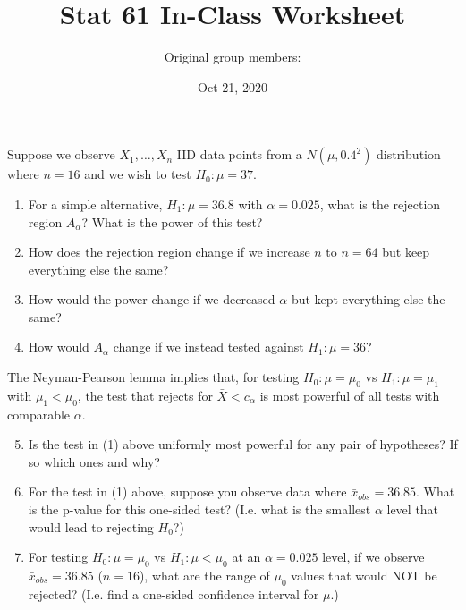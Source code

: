 \documentclass[12pt]{article}
\title{Stat 61 In-Class Worksheet}
\date{Oct 21, 2020}
\author{Original group members: }
\begin{document}
\maketitle



\noindent Suppose we observe $X_1, \dots, X_n$ IID data points from a $N(\mu, 0.4^2)$ distribution where $n=16$ and we wish to test $H_0: \mu = 37$. 


\begin{enumerate}[leftmargin=\labelsep]
\item For a simple alternative, $H_1: \mu = 36.8$ with $\alpha = 0.025$, what is the rejection region $A_{\alpha}$? What is the power of this test?

\vspace{6cm}

\item How does the rejection region change if we increase $n$ to $n=64$ but keep everything else the same? 
\vspace{2cm}

\item How would the power change if we decreased $\alpha$ but kept everything else the same? 
\vspace{2cm}

\item How would $A_{\alpha}$ change if we instead tested against $H_1: \mu = 36$?

\vspace{2cm}
\end{enumerate}

\pagebreak 

\noindent The Neyman-Pearson lemma implies that, for testing $H_0: \mu = \mu_0$ vs $H_1: \mu = \mu_1$ with $\mu_1 < \mu_0$, the test that rejects for $\bar{X} < c_{\alpha}$ is most powerful of all tests with comparable $\alpha$. 

\begin{enumerate}[leftmargin=\labelsep]
\setcounter{enumi}{4}
\item Is the test in (1) above uniformly most powerful for any pair of hypotheses? If so which ones and why? 
\vspace{2cm}

\item For the test in (1) above, suppose you observe data where $\bar{x}_{obs} = 36.85$. What is the p-value for this one-sided test? (I.e. what is the smallest $\alpha$ level that would lead to rejecting $H_0$?) 
\vspace{6cm}

\item For testing $H_0: \mu =\mu_0$ vs $H_1: \mu < \mu_0$ at an $\alpha=0.025$ level, if we observe $\bar{x}_{obs} = 36.85$ ($n=16$), what are the range of $\mu_0$ values that would NOT be rejected? (I.e. find a one-sided confidence interval for $\mu$.) 

\end{enumerate}
\end{document}
